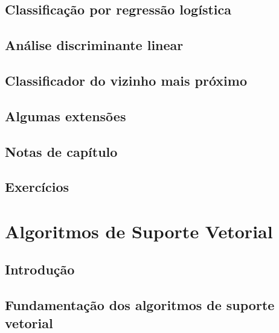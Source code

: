 \documentclass[
]{latex/krantz}
\theoremstyle{definition}
\theoremstyle{definition}
\theoremstyle{definition}
\theoremstyle{definition}
\theoremstyle{remark}
\begin{document}
\hypertarget{classificauxe7uxe3o-por-regressuxe3o-loguxedstica}{%
\section{Classificação por regressão logística}\label{classificauxe7uxe3o-por-regressuxe3o-loguxedstica}}

\hypertarget{anuxe1lise-discriminante-linear}{%
\section{Análise discriminante linear}\label{anuxe1lise-discriminante-linear}}

\hypertarget{classificador-do-vizinho-mais-pruxf3ximo}{%
\section{Classificador do vizinho mais próximo}\label{classificador-do-vizinho-mais-pruxf3ximo}}

\hypertarget{algumas-extensuxf5es}{%
\section{Algumas extensões}\label{algumas-extensuxf5es}}

\hypertarget{notas-de-capuxedtulo-7}{%
\section{Notas de capítulo}\label{notas-de-capuxedtulo-7}}

\hypertarget{exercuxedcios-7}{%
\section{Exercícios}\label{exercuxedcios-7}}

\hypertarget{algoritmos-de-suporte-vetorial}{%
\chapter{Algoritmos de Suporte Vetorial}\label{algoritmos-de-suporte-vetorial}}

\hypertarget{introduuxe7uxe3o-8}{%
\section{Introdução}\label{introduuxe7uxe3o-8}}

\hypertarget{fundamentauxe7uxe3o-dos-algoritmos-de-suporte-vetorial}{%
\section{Fundamentação dos algoritmos de suporte vetorial}\label{fundamentauxe7uxe3o-dos-algoritmos-de-suporte-vetorial}}
\end{document}

